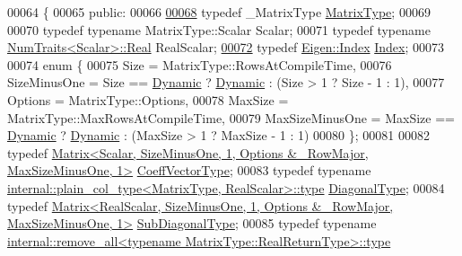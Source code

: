 \begin{DoxyCode}
00064 \{
00065   \textcolor{keyword}{public}:
00066 
\hyperlink{group___eigenvalues___module_add0f4b2216d0ea8ee0f7d8525deaf0a9}{00068}     \textcolor{keyword}{typedef} \_MatrixType \hyperlink{group___eigenvalues___module_add0f4b2216d0ea8ee0f7d8525deaf0a9}{MatrixType};
00069 
00070     \textcolor{keyword}{typedef} \textcolor{keyword}{typename} MatrixType::Scalar Scalar;
00071     \textcolor{keyword}{typedef} \textcolor{keyword}{typename} \hyperlink{group___core___module_struct_eigen_1_1_num_traits}{NumTraits<Scalar>::Real} RealScalar;
\hyperlink{group___eigenvalues___module_a7bd1f9fccec1e93b77a2214b2d30aae9}{00072}     \textcolor{keyword}{typedef} \hyperlink{namespace_eigen_a62e77e0933482dafde8fe197d9a2cfde}{Eigen::Index} \hyperlink{group___eigenvalues___module_a7bd1f9fccec1e93b77a2214b2d30aae9}{Index}; 
00073 
00074     \textcolor{keyword}{enum} \{
00075       Size = MatrixType::RowsAtCompileTime,
00076       SizeMinusOne = Size == \hyperlink{namespace_eigen_ad81fa7195215a0ce30017dfac309f0b2}{Dynamic} ? \hyperlink{namespace_eigen_ad81fa7195215a0ce30017dfac309f0b2}{Dynamic} : (Size > 1 ? Size - 1 : 1),
00077       Options = MatrixType::Options,
00078       MaxSize = MatrixType::MaxRowsAtCompileTime,
00079       MaxSizeMinusOne = MaxSize == \hyperlink{namespace_eigen_ad81fa7195215a0ce30017dfac309f0b2}{Dynamic} ? \hyperlink{namespace_eigen_ad81fa7195215a0ce30017dfac309f0b2}{Dynamic} : (MaxSize > 1 ? MaxSize - 1 : 1)
00080     \};
00081 
00082     \textcolor{keyword}{typedef} 
      \hyperlink{group___core___module}{Matrix<Scalar, SizeMinusOne, 1, Options & ~RowMajor, MaxSizeMinusOne, 1>}
       \hyperlink{group___core___module}{CoeffVectorType};
00083     \textcolor{keyword}{typedef} \textcolor{keyword}{typename} \hyperlink{class_eigen_1_1internal_1_1_tensor_lazy_evaluator_writable}{internal::plain\_col\_type<MatrixType, RealScalar>::type}
       \hyperlink{class_eigen_1_1internal_1_1_tensor_lazy_evaluator_writable}{DiagonalType};
00084     \textcolor{keyword}{typedef} 
      \hyperlink{group___core___module_class_eigen_1_1_matrix}{Matrix<RealScalar, SizeMinusOne, 1, Options & ~RowMajor, MaxSizeMinusOne, 1>}
       \hyperlink{group___core___module_class_eigen_1_1_matrix}{SubDiagonalType};
00085     \textcolor{keyword}{typedef} \textcolor{keyword}{typename} 
      \hyperlink{group___sparse_core___module}{internal::remove\_all<typename MatrixType::RealReturnType>::type}

\end{DoxyCode}
